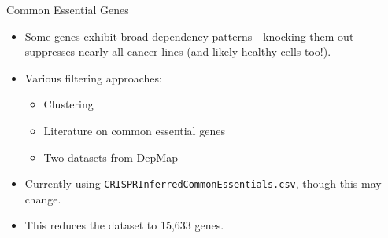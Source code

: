 \documentclass[handout]{beamer}
\begin{document}
\begin{frame}{Common Essential Genes}
    \begin{itemize}
        \item Some genes exhibit broad dependency patterns—knocking them out suppresses nearly all cancer lines (and likely healthy cells too!).
        \item Various filtering approaches:
        \begin{itemize}
            \item Clustering
            \item Literature on common essential genes
            \item Two datasets from DepMap
        \end{itemize}
        \item Currently using \texttt{CRISPRInferredCommonEssentials.csv}, though this may change.
        \item This reduces the dataset to 15,633 genes.
    \end{itemize}
\end{frame}
\end{document}
